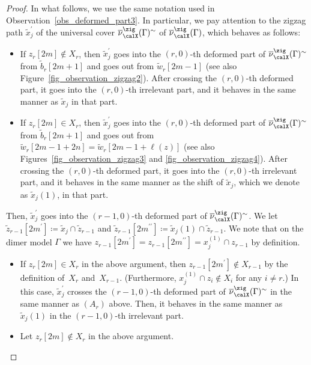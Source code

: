 \begin{proof}
In what follows, we use the same notation used in Observation~\ref{obs_deformed_part3}.
In particular, we pay attention to the zigzag path $\widetilde{x}_j^\prime$ of the universal cover $\overline{\nu}_\calX^\zig(\Gamma)^\sim$ of $\overline{\nu}_\calX^\zig(\Gamma)$, which behaves as follows:
\begin{itemize}\itemsep=0pt
\item[$(A_r)$] If $z_r[2m]\not\in X_r$, then $\widetilde{x}_j^\prime$ goes into the $(r,0)$-th deformed part of $\overline{\nu}_\calX^\zig(\Gamma)^\sim$ from $\widetilde{b}_r[2m+1]$ and goes out from $\widetilde{w}_r[2m-1]$ (see also Figure~\ref{fig_observation_zigzag2}).
After crossing the $(r,0)$-th deformed part, it goes into the $(r,0)$-th irrelevant part, and it behaves in the same manner as $\widetilde{x}_j$ in that part.
\item[$(B_r)$] If $z_r[2m]\in X_r$, then $\widetilde{x}_j^\prime$ goes into the $(r,0)$-th deformed part of $\overline{\nu}_\calX^\zig(\Gamma)^\sim$ from $\widetilde{b}_r[2m+1]$ and goes out from $\widetilde{w}_r[2m-1+2n]=\widetilde{w}_r[2m-1+\ell(z)]$ (see also Figures~\ref{fig_observation_zigzag3} and \ref{fig_observation_zigzag4}).
After crossing the $(r,0)$-th deformed part, it goes into the $(r,0)$-th irrelevant part, and it behaves in the same manner as the shift of $\widetilde{x}_j$, which we denote as $\widetilde{x}_j(1)$, in that part.
\end{itemize}
Then, $\widetilde{x}_j^\prime$ goes into the $(r-1,0)$-th deformed part of $\overline{\nu}_\calX^\zig(\Gamma)^\sim$.
We let $\widetilde{z}_{r-1}[2m^\prime]\coloneqq \widetilde{x}_j\cap \widetilde{z}_{r-1}$ and $\widetilde{z}_{r-1}[2m^{\prime\prime}]\coloneqq \widetilde{x}_j(1)\cap \widetilde{z}_{r-1}$.
We note that on the dimer model $\Gamma$ we have $z_{r-1}[2m^\prime]=z_{r-1}[2m^{\prime\prime}]=x_j^{(1)}\cap z_{r-1}$ by definition.
\begin{itemize}\itemsep=0pt
\item If $z_r[2m]\in X_r$ in the above argument, then $z_{r-1}[2m^\prime]\not\in X_{r-1}$ by the definition of~$X_r$ and~$X_{r-1}$.
(Furthermore, $x_j^{(1)}\cap z_i\not\in X_i$ for any $i\neq r$.)
In this case, $\widetilde{x}_j^\prime$ crosses the $(r-1,0)$-th deformed part of $\overline{\nu}_\calX^\zig(\Gamma)^\sim$ in the same manner as $(A_r)$ above.
Then, it behaves in the same manner as $\widetilde{x}_j(1)$ in the $(r-1,0)$-th irrelevant part.
\item Let $z_r[2m]\not\in X_r$ in the above argument.
\begin{itemize}\itemsep=0pt

\end{itemize}
\end{itemize}
\end{proof}
